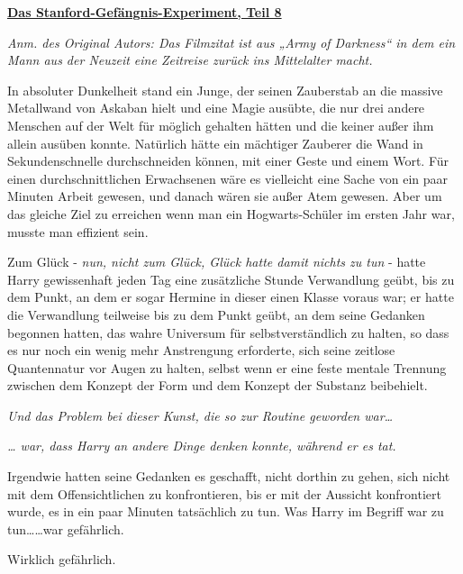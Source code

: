 

\hypertarget{das-stanford-gefuxe4ngnis-experiment-teil-8}{%

\textbf{\uline{Das Stanford-Gefängnis-Experiment, Teil 8}}

\emph{Anm. des Original Autors: Das Filmzitat ist aus „Army of Darkness“ in dem ein Mann aus der Neuzeit eine Zeitreise zurück ins Mittelalter macht.}

In absoluter Dunkelheit stand ein Junge, der seinen Zauberstab an die massive Metallwand von Askaban hielt und eine Magie ausübte, die nur drei andere Menschen auf der Welt für möglich gehalten hätten und die keiner außer ihm allein ausüben konnte. Natürlich hätte ein mächtiger Zauberer die Wand in Sekundenschnelle durchschneiden können, mit einer Geste und einem Wort. Für einen durchschnittlichen Erwachsenen wäre es vielleicht eine Sache von ein paar Minuten Arbeit gewesen, und danach wären sie außer Atem gewesen. Aber um das gleiche Ziel zu erreichen wenn man ein Hogwarts-Schüler im ersten Jahr war, musste man effizient sein.

Zum Glück - \emph{nun, nicht zum Glück, Glück hatte damit nichts zu tun} - hatte Harry gewissenhaft jeden Tag eine zusätzliche Stunde Verwandlung geübt, bis zu dem Punkt, an dem er sogar Hermine in dieser einen Klasse voraus war; er hatte die Verwandlung teilweise bis zu dem Punkt geübt, an dem seine Gedanken begonnen hatten, das wahre Universum für selbstverständlich zu halten, so dass es nur noch ein wenig mehr Anstrengung erforderte, sich seine zeitlose Quantennatur vor Augen zu halten, selbst wenn er eine feste mentale Trennung zwischen dem Konzept der Form und dem Konzept der Substanz beibehielt.

\emph{Und das Problem bei dieser Kunst, die so zur Routine geworden war…}

\emph{… war, dass Harry an andere Dinge denken konnte, während er es tat.}

Irgendwie hatten seine Gedanken es geschafft, nicht dorthin zu gehen, sich nicht mit dem Offensichtlichen zu konfrontieren, bis er mit der Aussicht konfrontiert wurde, es in ein paar Minuten tatsächlich zu tun. Was Harry im Begriff war zu tun……war gefährlich.

Wirklich gefährlich.

}
